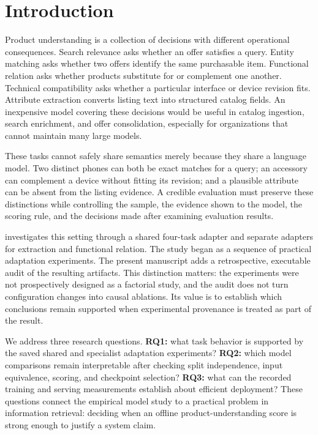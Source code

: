 \section{Introduction}
\label{sec:introduction}
Product understanding is a collection of decisions with different operational consequences. Search relevance asks whether an offer satisfies a query. Entity matching asks whether two offers identify the same purchasable item. Functional relation asks whether products substitute for or complement one another. Technical compatibility asks whether a particular interface or device revision fits. Attribute extraction converts listing text into structured catalog fields. An inexpensive model covering these decisions would be useful in catalog ingestion, search enrichment, and offer consolidation, especially for organizations that cannot maintain many large models.

These tasks cannot safely share semantics merely because they share a language model. Two distinct phones can both be exact matches for a query; an accessory can complement a device without fitting its revision; and a plausible attribute can be absent from the listing evidence. A credible evaluation must preserve these distinctions while controlling the sample, the evidence shown to the model, the scoring rule, and the decisions made after examining evaluation results.

\method{} investigates this setting through a shared four-task adapter and separate adapters for extraction and functional relation. The study began as a sequence of practical adaptation experiments. The present manuscript adds a retrospective, executable audit of the resulting artifacts. This distinction matters: the experiments were not prospectively designed as a factorial study, and the audit does not turn configuration changes into causal ablations. Its value is to establish which conclusions remain supported when experimental provenance is treated as part of the result.

We address three research questions. \textbf{RQ1:} what task behavior is supported by the saved shared and specialist adaptation experiments? \textbf{RQ2:} which model comparisons remain interpretable after checking split independence, input equivalence, scoring, and checkpoint selection? \textbf{RQ3:} what can the recorded training and serving measurements establish about efficient deployment? These questions connect the empirical model study to a practical problem in information retrieval: deciding when an offline product-understanding score is strong enough to justify a system claim.

